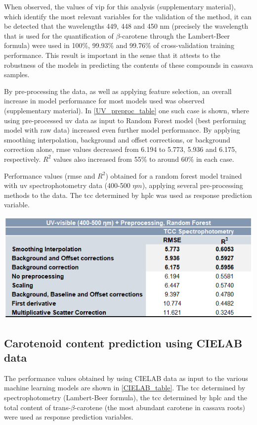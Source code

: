 When observed, the values of \acrfull{vip} for this analysis (supplementary material), which identify the most relevant variables for the validation of the method, it can be detected that the wavelengths 449, 448 and 450 nm (precisely the wavelength that is used for the quantification of $\beta$-carotene through the Lambert-Beer formula) were used in 100\%, 99.93\% and 99.76\% of cross-validation training performance. This result is important in the sense that it attests to the robustness of the models in predicting the contents of these compounds in cassava samples.

By pre-processing the data, as well as applying feature selection, an overall increase in model performance for most models used was observed (supplementary material). In \autoref{UV_preproc_table} one such case is shown, where using pre-processed \gls{uv} data as input to Random Forest model (best performing model with raw data) increased even further model performance. By applying smoothing interpolation, background and offset corrections, or background correction alone, \gls{rmse} values decreased from 6.194 to 5.773, 5.936 and 6.175, respectively. $R^{2}$ values also increased from 55\% to around 60\% in each case.


\begin{table}[h]
	\centering
	\caption{Performance values (\gls{rmse} and $R^{2}$) obtained for a random forest model trained with \gls{uv} spectrophotometry data (400-500 $\eta m$), applying several pre-processing methods to the data. The \gls{tcc} determined by \gls{hplc} was used as response prediction variable.}	
	\includegraphics[width=0.8\linewidth]{Imagens/Case_study/UV_preproc_table}
	\label{UV_preproc_table}	
\end{table}


\subsection{Carotenoid content prediction using CIELAB data} \label{ml_cielab_subsec}

The performance values obtained by using CIELAB data as input to the various machine learning models are shown in \autoref{CIELAB_table}. The \gls{tcc} determined by spectrophotometry (Lambert-Beer formula), the \gls{tcc} determined by \gls{hplc} and the total content of trans-$\beta$-carotene (the most abundant carotene in cassava roots) were used as response prediction variables.



